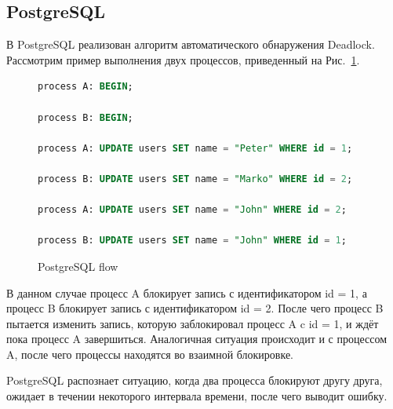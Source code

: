 \subsection{PostgreSQL}

В PostgreSQL реализован алгоритм автоматического обнаружения Deadlock\cite{ref_postgre_deadlock}. Рассмотрим пример выполнения двух процессов, приведенный на Рис.~\ref{fig:postgre-flow}.

\begin{figure}[h]
\begin{lstlisting}[language=SQL]
process A: BEGIN;

process B: BEGIN;

process A: UPDATE users SET name = "Peter" WHERE id = 1;

process B: UPDATE users SET name = "Marko" WHERE id = 2;

process A: UPDATE users SET name = "John" WHERE id = 2;

process B: UPDATE users SET name = "John" WHERE id = 1;
\end{lstlisting}
\caption{PostgreSQL flow} 
\label{fig:postgre-flow}
\end{figure}

В данном случае процесс A блокирует запись с идентификатором id = 1, а процесс B блокирует запись с идентификатором id = 2. После чего процесс B пытается изменить запись, которую заблокировал процесс A c id = 1, и ждёт пока процесс A завершиться. Аналогичная ситуация происходит и с процессом A, после чего процессы находятся во взаимной блокировке.

PostgreSQL распознает ситуацию, когда два процесса блокируют другу друга, ожидает в течении некоторого интервала времени, после чего выводит ошибку.

\clearpage